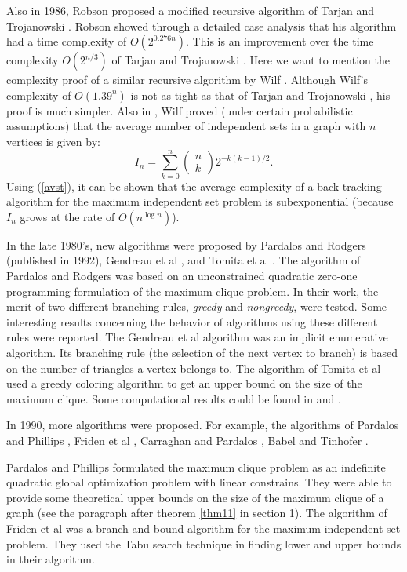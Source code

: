 Also in 1986, Robson \cite{Rob86} proposed a modified recursive
algorithm of Tarjan and Trojanowski \cite{TaTr77}. Robson showed
through a detailed case analysis that his algorithm had a time
complexity of $O(2^{0.276n})$. This is an improvement over the time
complexity $O(2^{n/3})$ of Tarjan and Trojanowski \cite{TaTr77}.
Here we want to mention the complexity proof of a similar recursive
algorithm by Wilf \cite{Wil86.2}. Although Wilf's complexity of
$O(1.39^{n})$ is not as tight as that of Tarjan and Trojanowski
\cite{TaTr77}, his proof is much simpler. Also in \cite{Wil86.2},
Wilf proved (under certain probabilistic assumptions) that the
average number of independent sets in a graph with $n$ vertices
is given by:
\begin{equation}
I_n = \sum ^{n}_{k = 0} \left ( \begin{array}{c}
				n \\ k
				\end{array}
			\right)
		2^{-k(k-1)/2}.
	\label{avst}
\end{equation}
Using (\ref{avst}), it can be shown that the average complexity of a
back tracking algorithm for the maximum independent set problem is
subexponential (because $I_n$ grows at the rate of $O(n^{\log n})$).

In the late 1980's, new algorithms were proposed by Pardalos and Rodgers
\cite{PaRo92} (published in 1992), Gendreau et al \cite{GeSaSo89}
\cite{GePiZu88}, and Tomita et al \cite{ToKoTa88}. The algorithm of
Pardalos and Rodgers \cite{PaRo92} was based on an unconstrained
quadratic zero-one programming formulation of the maximum clique
problem. In their work, the merit of two different branching rules,
{\em greedy} and {\em nongreedy}, were tested. Some interesting
results concerning the behavior of algorithms using these different
rules were reported. The Gendreau et al \cite{GeSaSo89} algorithm
was an implicit enumerative algorithm. Its branching rule (the
selection of the next vertex to branch) is based on the number of
triangles a vertex belongs to. The algorithm of Tomita et al
\cite{ToKoTa88} used a greedy coloring algorithm to get an upper
bound on the size of the maximum clique. Some computational results
could be found in \cite{GeSaSo89} and \cite{ToKoTa88}.

In 1990, more algorithms were proposed. For example, the algorithms
of Pardalos and Phillips \cite{PaPh90}, Friden et al
\cite{FrHeWe90}, Carraghan and Pardalos \cite{CaPa90.1}, Babel and
Tinhofer \cite{BaTi90}.

Pardalos and Phillips \cite{PaPh90} formulated the maximum clique
problem as an indefinite quadratic global optimization problem with
linear constrains. They were able to provide some theoretical upper
bounds on the size of the maximum clique of a graph (see the
paragraph after theorem \ref{thm11} in section 1). The algorithm of
Friden et al \cite{FrHeWe90} was a branch and bound algorithm for
the maximum independent set problem. They used the Tabu search
technique in finding lower and upper bounds in their algorithm.


